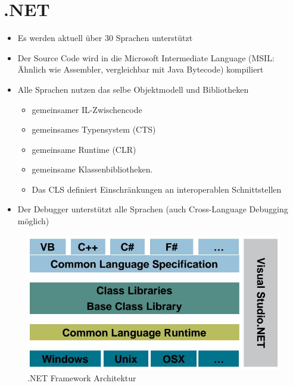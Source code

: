 \documentclass[
a4paper,
oneside,
10pt,
fleqn,
headsepline,
toc=listofnumbered, 
bibliography=totocnumbered]{scrartcl}
\let\stdsection\section
\renewcommand\section{\clearpage\stdsection}
\begin{document}
\section{.NET}
\begin{itemize}
	\item Es werden aktuell über 30 Sprachen unterstützt
	\item Der Source Code wird in die Microsoft Intermediate Language  (MSIL: Ähnlich wie Assembler, vergleichbar mit Java Bytecode) kompiliert
	\item Alle Sprachen nutzen das selbe Objektmodell und Bibliotheken
	      \begin{itemize}
		      \item gemeinsamer IL-Zwischencode
		      \item gemeinsames Typensystem (CTS)
		      \item gemeinsame Runtime (CLR)
		      \item gemeinsame Klassenbibliotheken.
		      \item Das CLS definiert Einschränkungen an interoperablen Schnittstellen
	      \end{itemize}
	\item Der Debugger unterstützt alle Sprachen (auch Cross-Language Debugging möglich)
\end{itemize}
\begin{figure}[ht]
	\centering
	\includegraphics[width=0.6\linewidth]{images/net_framework_architektur}
	\caption{.NET Framework Architektur}
	\label{fig:netframeworkarchitektur}
\end{figure}
\end{document}
